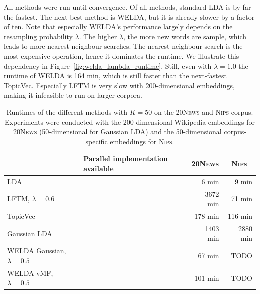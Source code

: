 \documentclass[
        a4paper,
        titlepage,
        twoside,
        parskip
        ]{scrbook}
\newcommand{\ra}[1]{\renewcommand{\arraystretch}{#1}}
\newcommand{\cmark}{\ding{51}}
\newcommand{\xmark}{\ding{55}}
\theoremstyle{break}
\begin{document}
All methods were run until convergence.
Of all methods, standard LDA is by far the fastest.
The next best method is WELDA, but it is already slower by a factor of ten.
Note that especially WELDA's performance largely depends on the resampling probability $\lambda$.
The higher $\lambda$, the more new words are sample, which leads to more nearest-neighbour searches.
The nearest-neighbour search is the most expensive operation, hence it dominates the runtime.
We illustrate this dependency in Figure~\ref{fig:welda_lambda_runtime}.
Still, even with $\lambda = 1.0$ the runtime of WELDA is 164 min, which is still faster than the next-fastest TopicVec.
Especially LFTM is very slow with 200-dimensional embeddings, making it infeasible to run on larger corpora.

\begin{table}[]
  \ra{1.2}
  \centering
  \caption{Runtimes of the different methods with $K = 50$ on the \textsc{20News} and \textsc{Nips} corpus.
  Experiments were conducted with the 200-dimensional Wikipedia embeddings for \textsc{20News} (50-dimensional for Gaussian LDA) and the 50-dimensional corpus-specific embeddings for \textsc{Nips}.
  }
  \label{table:runtime}
  \begin{tabular}{@{}lp{4cm}rr@{}}
    \toprule
                                    & Parallel implementation \newline available & \multicolumn{1}{c}{\textsc{20News}} & \multicolumn{1}{c}{\textsc{Nips}} \\
    \midrule
    LDA                             & ~~~~~~~~~~~~~~~~\cmark                     &    6 min                            &    9 min \\ %
    LFTM, $\lambda = 0.6$           & ~~~~~~~~~~~~~~~~\xmark                     & 3672 min                            &   71 min \\
    TopicVec                        & ~~~~~~~~~~~~~~~~\cmark                     &  178 min                            &  116 min \\
    Gaussian LDA                    & ~~~~~~~~~~~~~~~~\xmark                     & 1403 min                            & 2880 min \\
    WELDA Gaussian, $\lambda = 0.5$ & ~~~~~~~~~~~~~~~~\xmark                     &   67 min                            & TODO \\  %
    WELDA vMF, $\lambda = 0.5$      & ~~~~~~~~~~~~~~~~\xmark                     &  101 min                            & TODO \\ \bottomrule
  \end{tabular}
\end{table}
\end{document}
